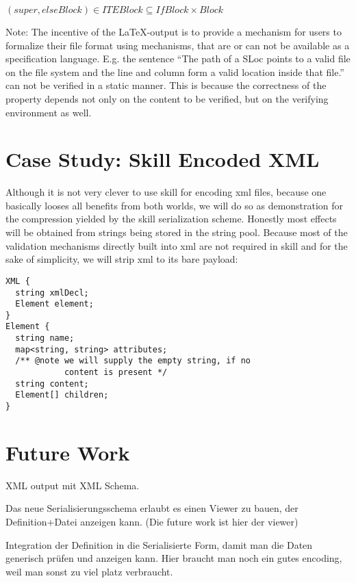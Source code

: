 \documentclass[a4paper,10pt]{article}
\begin{document}
$(super, elseBlock) \in ITEBlock \subseteq IfBlock \times Block$

Note: The incentive of the \LaTeX-output is to provide a mechanism for users to formalize their file format using mechanisms, that are or can not be available as a specification language. E.g. the sentence ``The path of a SLoc points to a valid file on the file system and the line and column form a valid location inside that file.'' can not be verified in a static manner. This is because the correctness of the property depends not only on the content to be verified, but on the verifying environment as well.

\section{Case Study: Skill Encoded XML}
Although it is not very clever to use skill for encoding xml files, because one basically looses all benefits from both worlds, we will do so as demonstration for the compression yielded by the skill serialization scheme. Honestly most effects will be obtained from strings being stored in the string pool. Because most of the validation mechanisms directly built into xml are not required in skill and for the sake of simplicity, we will strip xml to its bare payload:
\begin{lstlisting}[label=sex,caption=Skill Encoded XML]
XML {
  string xmlDecl;
  Element element;
}
Element {
  string name;
  map<string, string> attributes;
  /** @note we will supply the empty string, if no
            content is present */
  string content;
  Element[] children;
}
\end{lstlisting}


\section{Future Work}

XML output mit XML Schema.

Das neue Serialisierungsschema erlaubt es einen Viewer zu bauen, der Definition+Datei anzeigen kann. (Die future work ist hier der viewer)

Integration der Definition in die Serialisierte Form, damit man die Daten generisch prüfen und anzeigen kann. Hier braucht man noch ein gutes encoding, weil man sonst zu viel platz verbraucht.
\end{document}
